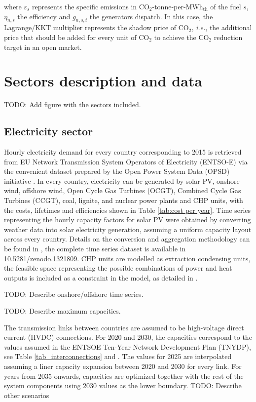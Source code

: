 \documentclass[3p]{elsarticle} %
\def\th{${}_{\textrm{th}}$}
\begin{document}
where $\varepsilon_{s}$ represents the specific emissions in CO$_2$-tonne-per-MWh\th{} of the fuel $s$, $\eta_{n,s}$ the efficiency and $g_{n,s,t}$ the generators dispatch. In this case, the Lagrange/KKT multiplier represents the shadow price of CO$_2$, \textit{i.e.}, the additional price that should be added for every unit of CO$_2$ to achieve the CO$_2$ reduction target in an open market. 

\section{Sectors description and data}

\textcolor[rgb]{1,0,0}{TODO: Add figure with the sectors included.}

\subsection{Electricity sector}
Hourly electricity demand for every country corresponding to 2015 is retrieved from EU Network Transmission System Operators of Electricity (ENTSO-E) via the convenient dataset prepared by the Open Power System Data (OPSD) initiative \cite{OPSD}. In every country, electricity can be generated by solar PV, onshore wind, offshore wind, Open Cycle Gas Turbines (OCGT), Combined Cycle Gas Turbines (CCGT), coal, lignite, and nuclear power plants and CHP units, with the costs, lifetimes and efficiencies shown in Table \ref{tab:cost per year}. Time series representing the hourly capacity factors for solar PV were obtained by converting weather data into solar electricity generation, assuming a uniform capacity layout across every country. Details on the conversion and aggregation methodology can be found in \cite{Victoria_2019b}, the complete time series dataset is available in \href{https://doi.org/10.5281/zenodo.1321809}{10.5281/zenodo.1321809}. CHP units are modelled as extraction condensing units, the feasible space representing the possible combinations of power and heat outputs is included as a constraint in the model, as detailed in \cite{Brown_2018}. \

\textcolor[rgb]{1,0,0}{TODO: Describe onshore/offshore time series.}

\textcolor[rgb]{1,0,0}{TODO: Describe maximum capacities. }

The transmission links between countries are assumed to be high-voltage direct current (HVDC) connections. For 2020 and 2030, the capacities correspond to the values assumed in the ENTSOE Ten-Year Network Development Plan (TNYDP), see Table \ref{tab_interconnections} and \cite{TYNDP2016}. The values for 2025 are interpolated assuming a liner capacity expansion between 2020 and 2030 for every link. For years from 2035 onwards, capacities are optimized together with the rest of the system components using 2030 values as the lower boundary. \textcolor[rgb]{1,0,0}{TODO: Describe other scenarios} \
\end{document}
